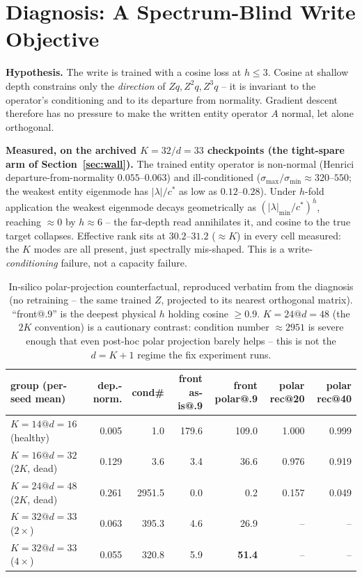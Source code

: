 \section{Diagnosis: A Spectrum-Blind Write Objective}
\label{sec:diagnosis}

\textbf{Hypothesis.} The write is trained with a cosine loss at $h \leq 3$.
Cosine at shallow depth constrains only the \emph{direction} of $Zq, Z^2q,
Z^3q$ -- it is invariant to the operator's conditioning and to its
departure from normality. Gradient descent therefore has no pressure to
make the written entity operator $A$ normal, let alone orthogonal.

\textbf{Measured, on the archived $K{=}32/d{=}33$ checkpoints (the
tight-spare arm of Section~\ref{sec:wall}).} The trained entity operator
is non-normal (Henrici departure-from-normality $0.055$--$0.063$) and
ill-conditioned ($\sigma_{\max}/\sigma_{\min} \approx 320$--$550$; the
weakest entity eigenmode has $|\lambda|/c^\ast$ as low as $0.12$--$0.28$).
Under $h$-fold application the weakest eigenmode decays geometrically as
$(|\lambda|_{\min}/c^\ast)^h$, reaching $\approx 0$ by $h \approx 6$ -- the
far-depth read annihilates it, and cosine to the true target collapses.
Effective rank sits at $30.2$--$31.2$ ($\approx K$) in every cell measured:
the $K$ modes are all present, just spectrally mis-shaped. This is a
write-\emph{conditioning} failure, not a capacity failure.

\begin{table}[h]
\centering
\small
\begin{tabular}{lrrrrrr}
\toprule
group (per-seed mean) & dep.-norm. & cond\# & front as-is@.9 & front polar@.9 & polar rec@20 & polar rec@40 \\
\midrule
$K{=}14@d{=}16$ (healthy) & 0.005 & 1.0 & 179.6 & 109.0 & 1.000 & 0.999 \\
$K{=}16@d{=}32$ ($2K$, dead) & 0.129 & 3.6 & 3.4 & 36.6 & 0.976 & 0.919 \\
$K{=}24@d{=}48$ ($2K$, dead) & 0.261 & 2951.5 & 0.0 & 0.2 & 0.157 & 0.049 \\
$K{=}32@d{=}33$ ($2\times$) & 0.063 & 395.3 & 4.6 & 26.9 & -- & -- \\
$K{=}32@d{=}33$ ($4\times$) & 0.055 & 320.8 & 5.9 & \textbf{51.4} & -- & -- \\
\bottomrule
\end{tabular}
\caption{In-silico polar-projection counterfactual, reproduced verbatim
from the diagnosis (no retraining -- the same trained $Z$, projected to
its nearest orthogonal matrix). ``front@.9'' is the deepest physical $h$
holding cosine $\geq 0.9$. $K{=}24@d{=}48$ (the $2K$ convention) is a
cautionary contrast: condition number $\approx 2951$ is severe enough that
even post-hoc polar projection barely helps -- this is not the $d{=}K{+}1$
regime the fix experiment runs.}
\label{tab:diagnosis}
\end{table}

